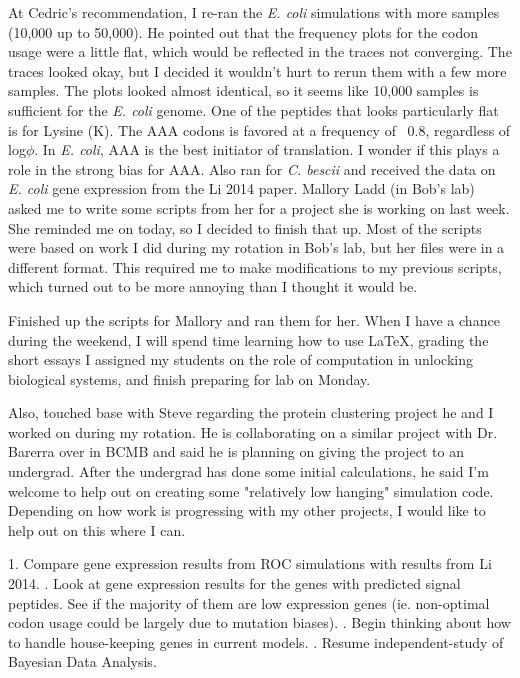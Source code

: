 \documentclass[11pt]{labbook}
\begin{document}
At Cedric's recommendation, I re-ran the \textit{E. coli} simulations with more samples (10,000 up to 50,000). He pointed out that the frequency plots for the codon usage were a little flat, which would be reflected in the traces not converging. The traces looked okay, but I decided it wouldn't hurt to rerun them with a few more samples. The plots looked almost identical, so it seems like 10,000 samples is sufficient for the \textit{E. coli} genome. One of the peptides that looks particularly flat is for Lysine (K). The AAA codons is favored at a frequency of ~0.8, regardless of log$\phi$. In \textit{E. coli}, AAA is the best initiator of translation. I wonder if this plays a role in the strong bias for AAA.
\newline
Also ran for \textit{C. bescii} and received the data on \textit{E. coli} gene expression from the Li 2014 paper.
\newline
Mallory Ladd (in Bob's lab) asked me to write some scripts from her for a project she is working on last week. She reminded me on today, so I decided to finish that up. Most of the scripts were based on work I did during my rotation in Bob's lab, but her files were in a different format. This required me to make modifications to my previous scripts, which turned out to be more annoying than I thought it would be.

Finished up the scripts for Mallory and ran them for her. When I have a chance during the weekend, I will spend time learning how to use LaTeX, grading the short essays I assigned my students on the role of computation in unlocking biological systems, and finish preparing for lab on Monday.
\newline

Also, touched base with Steve regarding the protein clustering project he and I worked on during my rotation. He is collaborating on a similar project with Dr. Barerra over in BCMB and said he is planning on giving the project to an undergrad. After the undergrad has done some initial calculations, he said I'm welcome to help out on creating some "relatively low hanging" simulation code. Depending on how work is progressing with my other projects, I would like to help out on this where I can. 

1. Compare gene expression results from ROC simulations with results from Li 2014.
. Look at gene expression results for the genes with predicted signal peptides. See if the majority of them are low expression genes (ie. non-optimal codon usage could be largely due to mutation biases).
. Begin thinking about how to handle house-keeping genes in current models.
. Resume independent-study of Bayesian Data Analysis.
\end{document}
